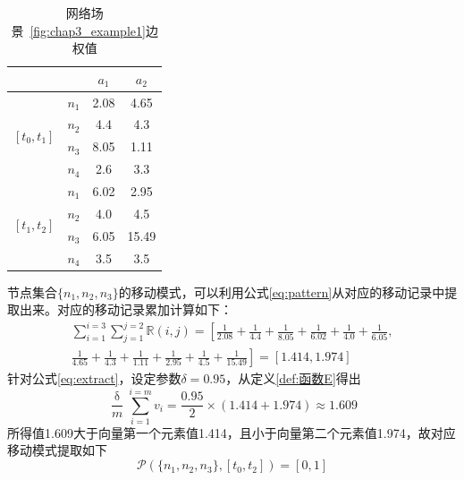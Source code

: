 \begin{table}[hbt]
\centering
  \caption{网络场景\figurename~\ref{fig:chap3_example1}边权值}
  \begin{tabular}{|c|c|cc|}
  \hline
    & & $a_1$ & $a_2$  \\
    \hline
    
    \multicolumn{1}{|c|}{\multirow{4}{*}{$[t_0,t_1]$}} & $n_1$ &2.08 & 4.65 \\
    & $n_2$ & 4.4 & 4.3 \\
    & $n_3$ & 8.05 & 1.11 \\
    & $n_4$ & 2.6 & 3.3 \\
    \hline

    \multicolumn{1}{|c|}{\multirow{4}{*}{$[t_1,t_2]$}} & $n_1$ &6.02 & 2.95 \\
    & $n_2$ & 4.0 & 4.5 \\
    & $n_3$ & 6.05 & 15.49 \\
    & $n_4$ & 3.5 & 3.5 \\
    \hline
  \end{tabular}
  \label{tab:chap3_example1}
\end{table}
节点集合$\{n_1,n_2,n_3\}$的移动模式，可以利用公式\ref{eq:pattern}从对应的移动记录中提取出来。对应的移动记录累加计算如下：
\begin{multline*}
\sum_{i=1}^{i=3}\sum_{j=1}^{j=2}\mathbb{R}(i,j) = \left[\frac{1}{2.08}+\frac{1}{4.4}+\frac{1}{8.05}+\frac{1}{6.02}+\frac{1}{4.0}+\frac{1}{6.05},\right.\\
\left.\frac{1}{4.65}+\frac{1}{4.3}+\frac{1}{1.11}+\frac{1}{2.95}+\frac{1}{4.5}+\frac{1}{15.49}\right]= [1.414,1.974]
\end{multline*}
针对公式\ref{eq:extract}，设定参数$\delta=0.95$，从定义\ref{def:函数E}得出
\[
\frac{\updelta}{m}\sum_{i=1}^{i=m}v_i=\frac{0.95}{2}\times(1.414+1.974)\approx 1.609
\] 
所得值1.609大于向量第一个元素值1.414，且小于向量第二个元素值1.974，故对应移动模式提取如下
\[
\mathcal{P}(\{n_1,n_2,n_3\},[t_0,t_2])=[0,1] 
\]

